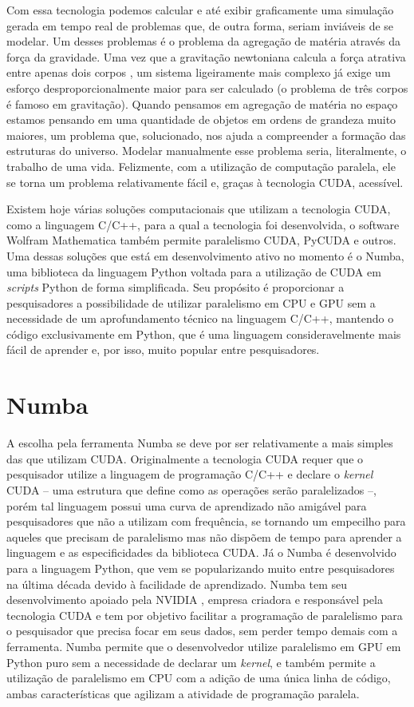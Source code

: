 \documentclass[
	12pt,				%
	a4paper,			%
	english,			%
	openright,				%
	brazil,				%
	oneside]{abntex2}
\begin{document}
	Com essa tecnologia podemos calcular e até exibir graficamente uma simulação gerada em tempo real de problemas que, de outra forma, seriam inviáveis de se modelar. Um desses problemas é o problema da agregação de matéria através da força da gravidade. Uma vez que a gravitação newtoniana calcula a força atrativa entre apenas dois corpos \cite{halliday}, um sistema ligeiramente mais complexo já exige um esforço desproporcionalmente maior para ser calculado (o problema de três corpos é famoso em gravitação). Quando pensamos em agregação de matéria no espaço estamos pensando em uma quantidade de objetos em ordens de grandeza muito maiores, um problema que, solucionado, nos ajuda a compreender a formação das estruturas do universo. Modelar manualmente esse problema seria, literalmente, o trabalho de uma vida. Felizmente, com a utilização de computação paralela, ele se torna um problema relativamente fácil e, graças à tecnologia CUDA, acessível.
	
	Existem hoje várias soluções computacionais que utilizam a tecnologia CUDA, como a linguagem C/C++, para a qual a tecnologia foi desenvolvida, o software Wolfram Mathematica também permite paralelismo CUDA, PyCUDA e outros. Uma dessas soluções que está em desenvolvimento ativo no momento é o Numba, uma biblioteca da linguagem Python voltada para a utilização de CUDA em \textit{scripts} Python de forma simplificada. Seu propósito é proporcionar a pesquisadores a possibilidade de utilizar paralelismo em CPU e GPU sem a necessidade de um aprofundamento técnico na linguagem C/C++, mantendo o código exclusivamente em Python, que é uma linguagem consideravelmente mais fácil de aprender e, por isso, muito popular entre pesquisadores.


\section{Numba}

	A escolha pela ferramenta Numba se deve por ser relativamente a mais simples das que utilizam CUDA. Originalmente a tecnologia CUDA requer que o pesquisador utilize a linguagem de programação C/C++ e declare o \textit{kernel} CUDA -- uma estrutura que define como as operações serão paralelizados --, porém tal linguagem possui uma curva de aprendizado não amigável para pesquisadores que não a utilizam com frequência, se tornando um empecilho para aqueles que precisam de paralelismo mas não dispõem de tempo para aprender a linguagem e as especificidades da biblioteca CUDA. Já o Numba é desenvolvido para a linguagem Python, que vem se popularizando muito entre pesquisadores na última década devido à facilidade de aprendizado. Numba tem seu desenvolvimento apoiado pela NVIDIA \cite{numba}, empresa criadora e responsável pela tecnologia CUDA e tem por objetivo facilitar a programação de paralelismo para o pesquisador que precisa focar em seus dados, sem perder tempo demais com a ferramenta. Numba permite que o desenvolvedor utilize paralelismo em GPU em Python puro sem a necessidade de declarar um \textit{kernel}, e também permite a utilização de paralelismo em CPU com a adição de uma única linha de código, ambas características que agilizam a atividade de programação paralela.
	
\end{document}
